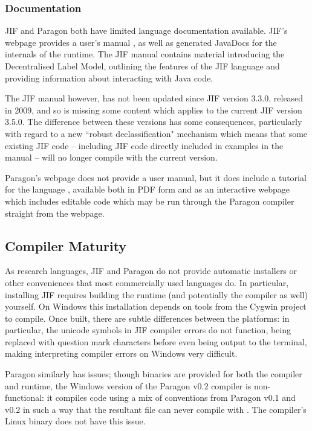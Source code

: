 \subsubsection{Documentation}

JIF and Paragon both have limited language documentation available. JIF's webpage \cite{jifwebsite} provides a user's manual \cite{jifmanual}, as well as generated JavaDocs for the internals of the runtime. The JIF manual contains material introducing the Decentralised Label Model, outlining the features of the JIF language and providing information about interacting with Java code.

The JIF manual however, has not been updated since JIF version 3.3.0, released in 2009, and so is missing some content which applies to the current JIF version 3.5.0. The difference between these versions has some consequences, particularly with regard to a new ``robust declassification" mechanism which means that some existing JIF code -- including JIF code directly included in examples in the manual -- will no longer compile with the current version.

Paragon's webpage \cite{parawebsite} does not provide a user manual, but it does include a tutorial for the language \cite{paratutorial}, available both in PDF form and as an interactive webpage which includes editable code which may be run through the Paragon compiler straight from the webpage.

\subsection{Compiler Maturity}

As research languages, JIF and Paragon do not provide automatic installers or other conveniences that most commercially used languages do. In particular, installing JIF requires building the runtime (and potentially the compiler as well) yourself. On Windows this installation depends on tools from the Cygwin project \cite{cygwinpage} to compile. Once built, there are subtle differences between the platforms: in particular, the unicode symbols in JIF compiler errors do not function, being replaced with question mark characters before even being output to the terminal, making interpreting compiler errors on Windows very difficult.

Paragon similarly has issues; though binaries are provided for both the compiler and runtime, the Windows version of the Paragon v0.2 compiler is non-functional: it compiles code using a mix of conventions from Paragon v0.1 and v0.2 in such a way that the resultant  file can never compile with . The compiler's Linux binary does not have this issue.

